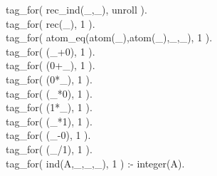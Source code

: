 \documentclass[11pt]{report}
\begin{document}
\begin{sf}
\begin{tabbing}
tag\_\hspace{0.1em}for( rec\_\hspace{0.1em}ind(\_\hspace{0.1em},\_\hspace{0.1em}), unroll ).\\[-0.15ex]
tag\_\hspace{0.1em}for( rec(\_\hspace{0.1em}), 1 ).\\[-0.15ex]
tag\_\hspace{0.1em}for( atom\_\hspace{0.1em}eq(atom(\_\hspace{0.1em}),atom(\_\hspace{0.1em}),\_\hspace{0.1em},\_\hspace{0.1em}), 1 ).\\[-0.15ex]
tag\_\hspace{0.1em}for( (\_\hspace{0.1em}+0), 1 ).\\[-0.15ex]
tag\_\hspace{0.1em}for( (0+\_\hspace{0.1em}), 1 ).\\[-0.15ex]
tag\_\hspace{0.1em}for( (0*\_\hspace{0.1em}), 1 ).\\[-0.15ex]
tag\_\hspace{0.1em}for( (\_\hspace{0.1em}*0), 1 ).\\[-0.15ex]
tag\_\hspace{0.1em}for( (1*\_\hspace{0.1em}), 1 ).\\[-0.15ex]
tag\_\hspace{0.1em}for( (\_\hspace{0.1em}*1), 1 ).\\[-0.15ex]
tag\_\hspace{0.1em}for( (\_\hspace{0.1em}-0), 1 ).\\[-0.15ex]
tag\_\hspace{0.1em}for( (\_\hspace{0.1em}/1), 1 ).\\[-0.15ex]
tag\_\hspace{0.1em}for( ind(A,\_\hspace{0.1em},\_\hspace{0.1em},\_\hspace{0.1em}), 1 ) :- integer(A).\\[-0.15ex]

\end{tabbing}
\end{sf}
\end{document}
